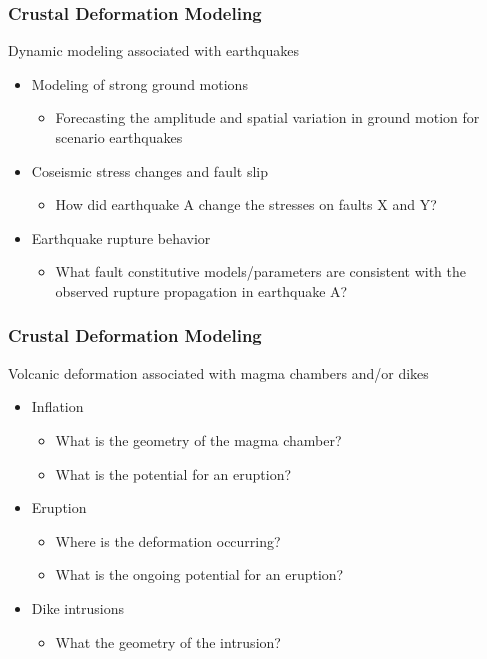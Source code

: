 \documentclass{beamer}
\begin{document}
\begin{frame}
  \frametitle{Crustal Deformation Modeling}

  \vfill
  Dynamic modeling associated with earthquakes
  \vfill

  \begin{itemize}
  \item Modeling of strong ground motions
    \begin{itemize}
    \item Forecasting the amplitude and spatial variation in ground
      motion for scenario earthquakes
    \end{itemize}
  \item Coseismic stress changes and fault slip
    \begin{itemize}
    \item How did earthquake A change the stresses on faults X and Y?
    \end{itemize}
  \item Earthquake rupture behavior
    \begin{itemize}
    \item What fault constitutive models/parameters are consistent
      with the observed rupture propagation in earthquake A?
    \end{itemize}
  \end{itemize}
  \vfill

\end{frame}


\begin{frame}
  \frametitle{Crustal Deformation Modeling}

  \vfill
  Volcanic deformation associated with magma chambers and/or dikes
  \begin{itemize}
  \item Inflation
    \begin{itemize}
    \item What is the geometry of the magma chamber?
    \item What is the potential for an eruption?
    \end{itemize}
  \item Eruption
    \begin{itemize}
    \item Where is the deformation occurring?
    \item What is the ongoing potential for an eruption?
    \end{itemize}
  \item Dike intrusions
    \begin{itemize}
    \item What the geometry of the intrusion?
    \end{itemize}
  \end{itemize}
  \vfill

\end{frame}
\end{document}
